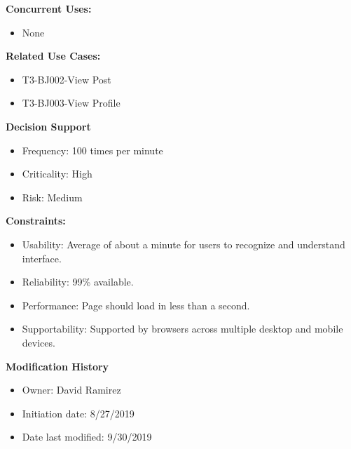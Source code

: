 \textbf{Concurrent Uses:}
\begin{itemize}
    \item None
\end{itemize}
\textbf{Related Use Cases:}
\begin{itemize}
    \item T3-BJ002-View Post
    \item T3-BJ003-View Profile
\end{itemize}
\textbf{Decision Support}
\begin{itemize}
    \item Frequency: 100 times per minute
    \item Criticality: High
    \item Risk: Medium
\end{itemize}
\textbf{Constraints:}
\begin{itemize}
    \item Usability: Average of about a minute for users to recognize and understand interface.
    \item Reliability: 99\% available.
    \item Performance: Page should load in less than a second.
    \item Supportability: Supported by browsers across multiple desktop and mobile devices.
\end{itemize}
\textbf{Modification History}
\begin{itemize}
    \item Owner: David Ramirez
    \item Initiation date: 8/27/2019
    \item Date last modified: 9/30/2019
\end{itemize}